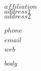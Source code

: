 \documentclass[$fontsize$,letterpaper,oneside]{article}
\date{}
\begin{document}
\thispagestyle{empty}

\begin{minipage}[t]{3.5in} 
  \flushright 
  \footnotesize {$affiliation$} \\
  \footnotesize {$address1$} \\
  \footnotesize {$address2$} 
\end{minipage}
\hfill     
\hfill
\begin{minipage}[t]{2in}
  \flushright 
  \footnotesize {$phone$} \, \faPhone \\
  {\footnotesize {\href{mailto:$email$}{$email$}} \, \faEnvelope} \\
  {\footnotesize {\href{http://$url$}{$web$}} \, \faGlobe}
\end{minipage}

\vspace{3em}

\reversemarginpar

\vspace{1em}

$body$
	
\end{document}
